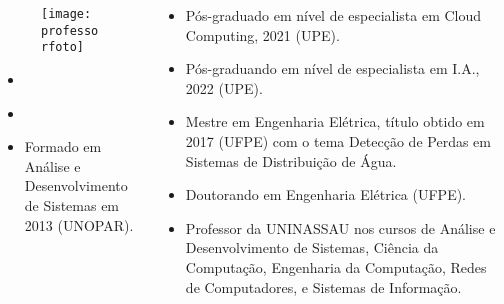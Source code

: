 \begin{frame}[t]

    \begin{columns}[onlytextwidth,T]

        \begin{column}[T]{0.49\linewidth}
            \begin{figure}[htb]
              \centering{}
              \texttt{[image: \\professorfoto]}
      
              \textbf{\href{\professorlattes}{\professor}}
            \end{figure}
      
            \begin{itemize}
              \justifying{}
              \setlength\itemsep{1em}
              \item \href{\professorsite}{\professorsite}
              \item \href{\professorlattes}{\professorlattes}
              \item Formado em Análise e Desenvolvimento de Sistemas em 2013 (UNOPAR).
            \end{itemize}
        \end{column}

        \begin{column}{0.5\linewidth}
            \small
            \begin{itemize}\small
                \justifying{}
                \item Pós-graduado em nível de especialista em Cloud Computing, 2021 (UPE).
                \item Pós-graduando em nível de especialista em I.A., 2022 (UPE).
                \item Mestre em Engenharia Elétrica, título obtido em 2017 (UFPE) com o tema Detecção de Perdas em Sistemas de Distribuição de Água.
                \item Doutorando em Engenharia Elétrica (UFPE).
                \item Professor da UNINASSAU nos cursos de Análise e Desenvolvimento de Sistemas, Ciência da Computação, Engenharia da Computação, Redes de Computadores, e Sistemas de Informação.
            \end{itemize}
        \end{column}

    \end{columns}

\end{frame}
